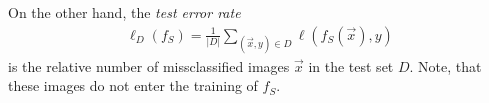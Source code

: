 On the other hand, the \textit{test error rate}
\begin{align}\label{eq:test_error}
	\ell_{D}(f_S) = \frac{1}{|D|} \sum_{(\vec{x}, y) \in D} \ell(f_S(\vec{x}), y)
\end{align}
is the relative number of missclassified images $\vec{x}$ in the test set $D$. Note, that these images do not enter the training of $f_S$.